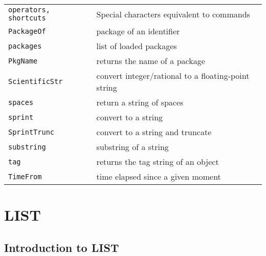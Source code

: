 \documentclass[a4paper]{mybook}
\begin{document}
\begin{center}
\begin{longtable}{ll}
{\verb~operators, shortcuts~} &
      Special characters equivalent to commands\\
   
{\verb~PackageOf~} &
      package of an identifier\\
   
{\verb~packages~} &
      list of loaded packages\\
   
{\verb~PkgName~} &
      returns the name of a package\\
   
{\verb~ScientificStr~} &
      convert integer/rational to a floating-point string\\
   
{\verb~spaces~} &
      return a string of spaces\\
   
{\verb~sprint~} &
      convert to a string\\
   
{\verb~SprintTrunc~} &
      convert to a string and truncate\\
   
{\verb~substring~} &
      substring of a string\\
   
{\verb~tag~} &
      returns the tag string of an object\\
   
{\verb~TimeFrom~} &
      time elapsed since a given moment\\
   
\end{longtable}
\end{center}

\noindent



\chapter{LIST}
\label{LIST}

      

\section{Introduction to LIST}
\label{Introduction to LIST}
\end{document}
